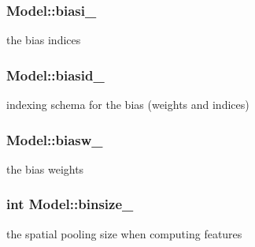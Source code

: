 \subsubsection[{biasi\+\_\+}]{ Model\+::biasi\+\_\+\hspace{0.3cm}{\ttfamily [protected]}}\label{classModel_a0306acb4cfa28b6f13ccd76c011d20ac}


the bias indices 

\hypertarget{classModel_a7c3905dd5e45a2e60da02c783a49db9c}{}
\subsubsection[{biasid\+\_\+}]{ Model\+::biasid\+\_\+\hspace{0.3cm}{\ttfamily [protected]}}\label{classModel_a7c3905dd5e45a2e60da02c783a49db9c}


indexing schema for the bias (weights and indices) 

\hypertarget{classModel_ab870c45d7637a43ba73c81cc4080a497}{}
\subsubsection[{biasw\+\_\+}]{ Model\+::biasw\+\_\+\hspace{0.3cm}{\ttfamily [protected]}}\label{classModel_ab870c45d7637a43ba73c81cc4080a497}


the bias weights 

\hypertarget{classModel_af34c4284d739cac02812d76eaa231679}{}
\subsubsection[{binsize\+\_\+}]{\setlength{\rightskip}{0pt plus 5cm}int Model\+::binsize\+\_\+\hspace{0.3cm}{\ttfamily [protected]}}\label{classModel_af34c4284d739cac02812d76eaa231679}


the spatial pooling size when computing features 

\hypertarget{classModel_a976b10b7048b41203eae19c141654abf}{}
